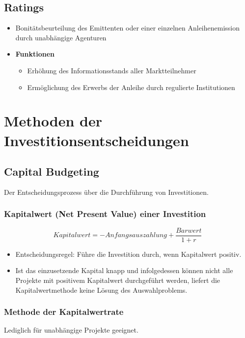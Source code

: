 \subsection{Ratings}
\begin{itemize}
	\item Bonitätsbeurteilung des Emittenten oder einer einzelnen Anleihenemission durch unabhängige Agenturen
	\item \textbf{Funktionen}
	\begin{itemize}
		\item Erhöhung des Informationsstands aller Marktteilnehmer
		\item Ermöglichung des Erwerbs der Anleihe durch regulierte Institutionen
	\end{itemize}
\end{itemize}



\section{Methoden der Investitionsentscheidungen}

\subsection{Capital Budgeting}
Der Entscheidungsprozess über die Durchführung von Investitionen.

\subsubsection{Kapitalwert (Net Present Value) einer Investition}

\[Kapitalwert = -Anfangsauszahlung + \frac{Barwert}{1+r}\]

\begin{itemize}
	\item Entscheidungsregel: Führe die Investition durch, wenn Kapitalwert positiv.
	\item Ist das einzusetzende Kapital knapp und infolgedessen können nicht alle Projekte mit positivem Kapitalwert durchgeführt werden, liefert die Kapitalwertmethode keine Lösung des Auswahlproblems.
\end{itemize}

\subsubsection{Methode der Kapitalwertrate}
Lediglich für unabhängige Projekte geeignet.

